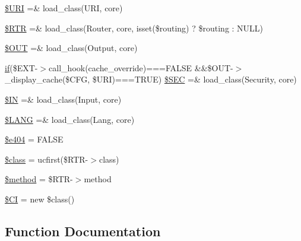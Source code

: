 \begin{DoxyCompactItemize}
\item 
\hyperlink{_code_igniter_8php_a630d83d898b39ad4568906284f7f5336}{\$\+U\+R\+I} =\& load\+\_\+class(\textquotesingle{}U\+R\+I\textquotesingle{}, \textquotesingle{}core\textquotesingle{})
\item 
\hyperlink{_code_igniter_8php_a4d6c9285c8483e4708a57a4128fc95f3}{\$\+R\+T\+R} =\& load\+\_\+class(\textquotesingle{}Router\textquotesingle{}, \textquotesingle{}core\textquotesingle{}, isset(\$routing) ? \$routing \+: N\+U\+L\+L)
\item 
\hyperlink{_code_igniter_8php_ad437402616c81c82c746f09854b23729}{\$\+O\+U\+T} =\& load\+\_\+class(\textquotesingle{}Output\textquotesingle{}, \textquotesingle{}core\textquotesingle{})
\item 
\hyperlink{assets_2js_2bootstrap_8min_8js_a87cf461060832b8b68a7b48d9e371e4f}{if}(\$E\+X\+T-\/$>$call\+\_\+hook(\textquotesingle{}cache\+\_\+override\textquotesingle{})===F\+A\+L\+S\+E \&\&\$O\+U\+T-\/$>$\+\_\+display\+\_\+cache(\$C\+F\+G, \$U\+R\+I)===T\+R\+U\+E) \hyperlink{_code_igniter_8php_af78ce53fb82103e1165678dd2d3385a4}{\$\+S\+E\+C} =\& load\+\_\+class(\textquotesingle{}Security\textquotesingle{}, \textquotesingle{}core\textquotesingle{})
\item 
\hyperlink{_code_igniter_8php_a66d076d48aff75a01bb726f5bdd94d46}{\$\+I\+N} =\& load\+\_\+class(\textquotesingle{}Input\textquotesingle{}, \textquotesingle{}core\textquotesingle{})
\item 
\hyperlink{_code_igniter_8php_afab4eb732acc05cebf41e0afce18681c}{\$\+L\+A\+N\+G} =\& load\+\_\+class(\textquotesingle{}Lang\textquotesingle{}, \textquotesingle{}core\textquotesingle{})
\item 
\hyperlink{_code_igniter_8php_a20b89fa011927fc498a4a665fa44d061}{\$e404} = F\+A\+L\+S\+E
\item 
\hyperlink{_code_igniter_8php_a252ba022809910ea710a068fc1bab657}{\$class} = ucfirst(\$R\+T\+R-\/$>$class)
\item 
\hyperlink{_code_igniter_8php_a12661b2fc0f57f97e30a1620889ce9c6}{\$method} = \$R\+T\+R-\/$>$method
\item 
\hyperlink{_code_igniter_8php_ae0314d046ddf7fcfaec03222977427d3}{\$\+C\+I} = new \$class()
\end{DoxyCompactItemize}


\subsection{Function Documentation}
\hypertarget{_code_igniter_8php_a185483844bd20a0e80955460d66d2199}{}
